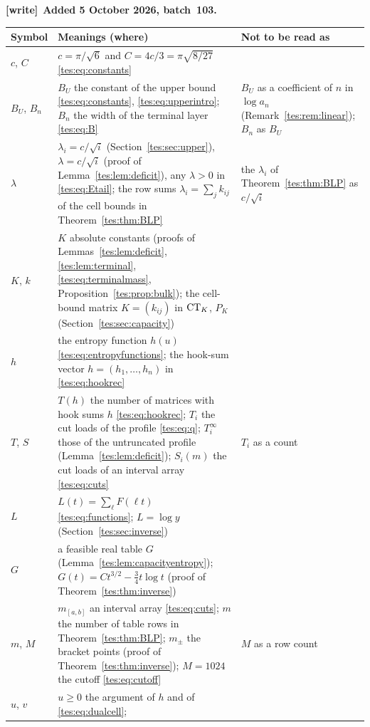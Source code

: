 \documentclass[11pt,a4paper]{article}
\theoremstyle{remark}\newtheorem{remark}[theorem]{Remark}
\numberwithin{equation}{section}
\newenvironment{writenote}[1][]{\par\smallskip\begingroup\small
 \noindent\textbf{[write]}\if\relax\detokenize{#1}\relax\else~\textbf{#1.}\fi\ }%
 {\par\endgroup\smallskip}
\begin{document}
\begin{writenote}[Added 5 October 2026, batch~103]
\smallskip
\begingroup\renewcommand{\arraystretch}{1.1}
\begin{longtable}{@{}>{\raggedright\arraybackslash}p{0.62in}>{\raggedright\arraybackslash}p{3.45in}>{\raggedright\arraybackslash}p{1.6in}@{}}
\toprule
Symbol & Meanings (where) & Not to be read as\\
\midrule
\endhead
$c$, $C$ & $c=\pi/\sqrt6$ and $C=4c/3=\pi\sqrt{8/27}$
 \eqref{tes:eq:constants} & \\
$B_U$, $B_n$ & $B_U$ the constant of the upper bound
 \eqref{tes:eq:constants}, \eqref{tes:eq:upperintro}; $B_n$ the width of
 the terminal layer \eqref{tes:eq:B} & $B_U$ as a coefficient of $n$ in
 $\log a_n$ (Remark~\ref{tes:rem:linear}); $B_n$ as $B_U$\\
$\lambda$ & $\lambda_i=c/\sqrt i$ (Section~\ref{tes:sec:upper}),
 $\lambda=c/\sqrt i$ (proof of Lemma~\ref{tes:lem:deficit}), any
 $\lambda>0$ in \eqref{tes:eq:Etail}; the row sums
 $\lambda_i=\sum_jk_{ij}$ of the cell bounds in
 Theorem~\ref{tes:thm:BLP} & the $\lambda_i$ of
 Theorem~\ref{tes:thm:BLP} as $c/\sqrt i$\\
$K$, $k$ & $K$ absolute constants (proofs of
 Lemmas~\ref{tes:lem:deficit}, \ref{tes:lem:terminal},
 \eqref{tes:eq:terminalmass}, Proposition~\ref{tes:prop:bulk}); the
 cell-bound matrix $K=(k_{ij})$ in $\operatorname{CT}_K$, $P_K$
 (Section~\ref{tes:sec:capacity}) & \\
$h$ & the entropy function $h(u)$ \eqref{tes:eq:entropyfunctions}; the
 hook-sum vector $h=(h_1,\ldots,h_n)$ in \eqref{tes:eq:hookrec} & \\
$T$, $S$ & $T(h)$ the number of matrices with hook sums $h$
 \eqref{tes:eq:hookrec}; $T_i$ the cut loads of the profile
 \eqref{tes:eq:q}; $T_i^\infty$ those of the untruncated profile
 (Lemma~\ref{tes:lem:deficit}); $S_i(m)$ the cut loads of an interval array
 \eqref{tes:eq:cuts} & $T_i$ as a count\\
$L$ & $L(t)=\sum_\ell F(\ell t)$ \eqref{tes:eq:functions}; $L=\log y$
 (Section~\ref{tes:sec:inverse}) & \\
$G$ & a feasible real table $G$ (Lemma~\ref{tes:lem:capacityentropy});
 $G(t)=Ct^{3/2}-\frac34t\log t$ (proof of
 Theorem~\ref{tes:thm:inverse}) & \\
$m$, $M$ & $m_{[a,b]}$ an interval array \eqref{tes:eq:cuts}; $m$ the
 number of table rows in Theorem~\ref{tes:thm:BLP}; $m_\pm$ the bracket
 points (proof of Theorem~\ref{tes:thm:inverse}); $M=1024$ the cutoff
 \eqref{tes:eq:cutoff} & $M$ as a row count\\
$u$, $v$ & $u\ge0$ the argument of $h$ and of \eqref{tes:eq:dualcell};

\end{longtable}
\end{writenote}
\end{document}
